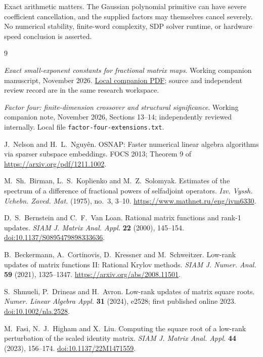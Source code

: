 \documentclass[11pt]{article}
\numberwithin{equation}{section}
\begin{document}
Exact arithmetic matters. The Gaussian polynomial primitive can have
severe coefficient cancellation, and the supplied factors may themselves
cancel severely. No numerical stability, finite-word complexity, SDP
solver runtime, or hardware speed conclusion is asserted.

\begin{thebibliography}{9}\raggedright
{}
\emph{Exact small-exponent constants for fractional matrix maps}.
Working companion manuscript, November 2026.
\href{sharp-fractional-holder.pdf}{Local companion PDF}; source and
independent review record are in the same research workspace.

\emph{Factor four: finite-dimension crossover and structural significance}.
Working companion note, November 2026, Sections 13--14; independently
reviewed internally. Local file \texttt{factor-four-extensions.txt}.

J.~Nelson and H.~L.~Nguy\^en.
OSNAP: Faster numerical linear algebra algorithms via sparser subspace embeddings.
FOCS 2013; Theorem 9 of \url{https://arxiv.org/pdf/1211.1002}.

M.~Sh.~Birman, L.~S.~Koplienko and M.~Z.~Solomyak.
Estimates of the spectrum of a difference of fractional powers of selfadjoint operators.
\emph{Izv. Vyssh. Uchebn. Zaved. Mat.} (1975), no.~3, 3--10.
\url{https://www.mathnet.ru/eng/ivm6330}.

D.~S.~Bernstein and C.~F.~Van Loan.
Rational matrix functions and rank-1 updates.
\emph{SIAM J. Matrix Anal. Appl.} \textbf{22} (2000), 145--154.
\href{https://doi.org/10.1137/S0895479898333636}{doi:10.1137/S0895479898333636}.

B.~Beckermann, A.~Cortinovis, D.~Kressner and M.~Schweitzer.
Low-rank updates of matrix functions II: Rational Krylov methods.
\emph{SIAM J. Numer. Anal.} \textbf{59} (2021), 1325--1347.
\url{https://arxiv.org/abs/2008.11501}.

S.~Shmueli, P.~Drineas and H.~Avron.
Low-rank updates of matrix square roots.
\emph{Numer. Linear Algebra Appl.} \textbf{31} (2024), e2528;
first published online 2023.
\href{https://doi.org/10.1002/nla.2528}{doi:10.1002/nla.2528}.

M.~Fasi, N.~J.~Higham and X.~Liu.
Computing the square root of a low-rank perturbation of the scaled identity matrix.
\emph{SIAM J. Matrix Anal. Appl.} \textbf{44} (2023), 156--174.
\href{https://doi.org/10.1137/22M1471559}{doi:10.1137/22M1471559}.
\end{thebibliography}
\end{document}
